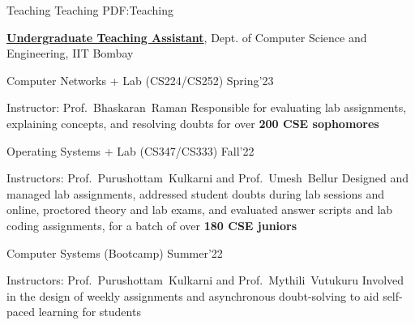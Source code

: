 \Section
{Teaching}
{Teaching}
{PDF:Teaching}

\Entry
\href{https://www.cse.iitb.ac.in}
{\textbf{Undergraduate Teaching Assistant}},
Dept. of Computer Science and Engineering, IIT Bombay 

\Gap
\BulletItem
Computer Networks + Lab (CS224/CS252)
\hfill
Spring'23
\begin{Detail}
\SubBulletItem
Instructor:
Prof.~Bhaskaran~Raman
\SubBulletItem
Responsible for evaluating lab assignments, explaining concepts, and resolving doubts for over {\bf 200 CSE sophomores}
\end{Detail}
\par
\BulletItem
Operating Systems + Lab (CS347/CS333)
\hfill
Fall'22
\begin{Detail}
\SubBulletItem
Instructors:
Prof.~Purushottam~Kulkarni and
Prof.~Umesh~Bellur
\SubBulletItem
Designed and managed lab assignments, addressed student doubts during lab sessions and online, proctored theory and
lab exams, and evaluated answer scripts and lab coding assignments, for a batch of over {\bf 180 CSE juniors}
\end{Detail}
\par
\BulletItem
Computer Systems (Bootcamp)
\hfill
Summer'22
\begin{Detail}
\SubBulletItem
Instructors:
Prof.~Purushottam~Kulkarni and
Prof.~Mythili~Vutukuru
\SubBulletItem
Involved in the design of weekly assignments and asynchronous doubt-solving to aid self-paced learning for students
\end{Detail}